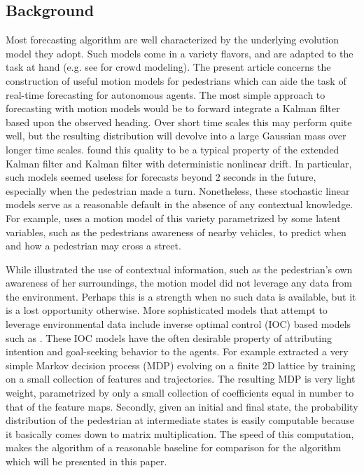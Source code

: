 \documentclass[conference]{IEEEtran}
\begin{document}

\subsection{Background}
Most forecasting algorithm are well characterized by the underlying evolution model they adopt.
Such models come in a variety flavors, and are adapted to the task at hand (e.g. see \cite{Helbing1992} for crowd modeling).
The present article concerns the construction of useful motion models for pedestrians which can aide the task of real-time forecasting for autonomous agents.
The most simple approach to forecasting with motion models would be to forward integrate a Kalman filter \cite{kalman1960new} based upon the observed heading.
Over short time scales this may perform quite well, but the resulting distribution will devolve into a large Gaussian mass over longer time scales.
\citet{Schneider2013} found this quality to be a typical property of the extended Kalman filter and Kalman filter with deterministic nonlinear drift.
In particular, such models seemed useless for forecasts beyond $2$ seconds in the future, especially when the pedestrian made a turn.
Nonetheless, these stochastic linear models serve as a reasonable default in the absence of any contextual knowledge.
For example, \citet{Kooji2014} uses a motion model of this variety parametrized by some latent variables, such as the pedestrians awareness of nearby vehicles, to predict when and how a pedestrian may cross a street.

While \cite{Kooji2014} illustrated the use of contextual information, such as the pedestrian's own awareness of her surroundings, the motion model did not leverage any data from the environment.
Perhaps this is a strength when no such data is available, but it is a lost opportunity otherwise.
More sophisticated models that attempt to leverage environmental data include inverse optimal control (IOC) based models such as \cite{Ziebart2008,Ziebart2009,Kitani2012,Karasev2016}.
These IOC models have the often desirable property of attributing intention and goal-seeking behavior to the agents.
For example \citet{Kitani2012} extracted a very simple Markov decision process (MDP) evolving on a finite 2D lattice by training on a small collection of features and trajectories.
The resulting MDP is very light weight, parametrized by only a small collection of coefficients equal in number to that of the feature maps.
Secondly, given an initial and final state, the probability distribution of the pedestrian at intermediate states is easily computable because it basically comes down to matrix multiplication.
The speed of this computation, makes the algorithm of \cite{Kitani2012} a reasonable baseline for comparison for the algorithm which will be presented in this paper.
\end{document}

